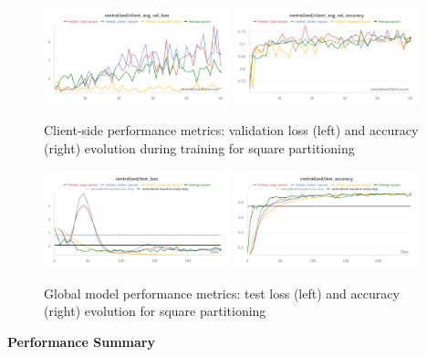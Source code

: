 \documentclass[11pt]{article}
\begin{document}
    \begin{figure}[h]
        \centering
        \includegraphics[width=0.48\textwidth]{img/experiment_1/square_client_avg_val_loss}
        \hfill
        \includegraphics[width=0.48\textwidth]{img/experiment_1/square_client_avg_val_acc}
        \caption{Client-side performance metrics: validation loss (left) and accuracy (right) evolution during training for square partitioning}
        \label{fig:square_client_metrics}
    \end{figure}

    \begin{figure}[h]
        \centering
        \includegraphics[width=0.48\textwidth]{img/experiment_1/square_server_test_loss}
        \hfill
        \includegraphics[width=0.48\textwidth]{img/experiment_1/square_server_test_acc}
        \caption{Global model performance metrics: test loss (left) and accuracy (right) evolution for square partitioning}
        \label{fig:square_global_metrics}
    \end{figure}

    \noindent
    \textbf{Performance Summary}
\end{document}
